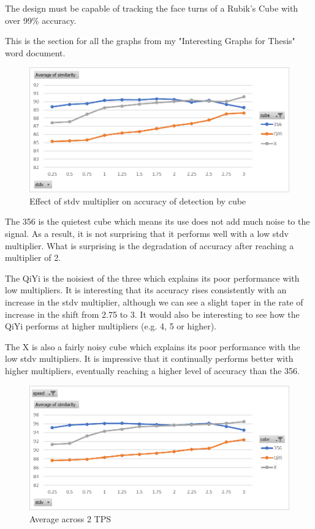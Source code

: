 The design must be capable of tracking the face turns of a Rubik's Cube with over 99\% accuracy.

This is the section for all the graphs from my "Interesting Graphs for Thesis" word document.

\begin{figure}[h]
    \centering
    \caption{Effect of stdv multiplier on accuracy of detection by cube}
    \label{fig:similarity-by-cube}
    \includegraphics[width=0.75\linewidth]{Figures/7 Evaluation/similarity_by_cube.png}
\end{figure}

The 356 is the quietest cube which means its use does not add much
noise to the signal. As a result, it is not surprising that it performs
well with a low stdv multiplier. What is surprising is the degradation
of accuracy after reaching a multiplier of 2.

The QiYi is the noisiest of the three which explains its poor
performance with low multipliers. It is interesting that its accuracy
rises consistently with an increase in the stdv multiplier, although we
can see a slight taper in the rate of increase in the shift from 2.75
to 3. It would also be interesting to see how the QiYi performs at
higher multipliers (e.g. 4, 5 or higher).

The X is also a fairly noisy cube which explains its poor performance
with the low stdv multipliers. It is impressive that it continually
performs better with higher multipliers, eventually reaching a higher
level of accuracy than the 356.

\begin{figure}[h]
    \centering
    \caption{Average across 2 TPS}
    \label{fig:similarity-by-cube-2tps}
    \includegraphics[width=0.75\linewidth]{Figures/7 Evaluation/similarity_by_cube_2tps.png}
\end{figure}

